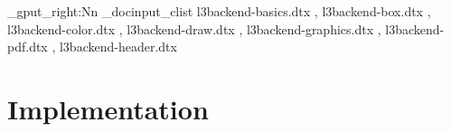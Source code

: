 \documentclass{l3doc}
\begin{document}
\makeatletter
\let\DelayPrintIndex\PrintIndex
\let\PrintIndex\@empty
\makeatother

\ExplSyntaxOn
\clist_gput_right:Nn \g_docinput_clist
  {
    l3backend-basics.dtx   ,
    l3backend-box.dtx      ,
    l3backend-color.dtx    ,
    l3backend-draw.dtx     ,
    l3backend-graphics.dtx ,
    l3backend-pdf.dtx      ,
    l3backend-header.dtx
  }
\ExplSyntaxOff

\part{Implementation}

\def\maketitle{}
\EnableImplementation
\DisableDocumentation
\DocInputAgain

\clearpage

\DelayPrintIndex
\end{document}
